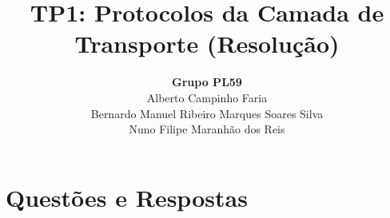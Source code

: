 \documentclass{llncs}
\begin{document}
\mainmatter

\title{TP1: Protocolos da Camada de Transporte (Resolução)}

\author{
  {\bfseries Grupo PL59} \\
  Alberto Campinho Faria \\
  Bernardo Manuel Ribeiro Marques Soares Silva \\
  Nuno Filipe Maranhão dos Reis
  }


\date{}

\maketitle



\section*{Questões e Respostas}






\end{document}
